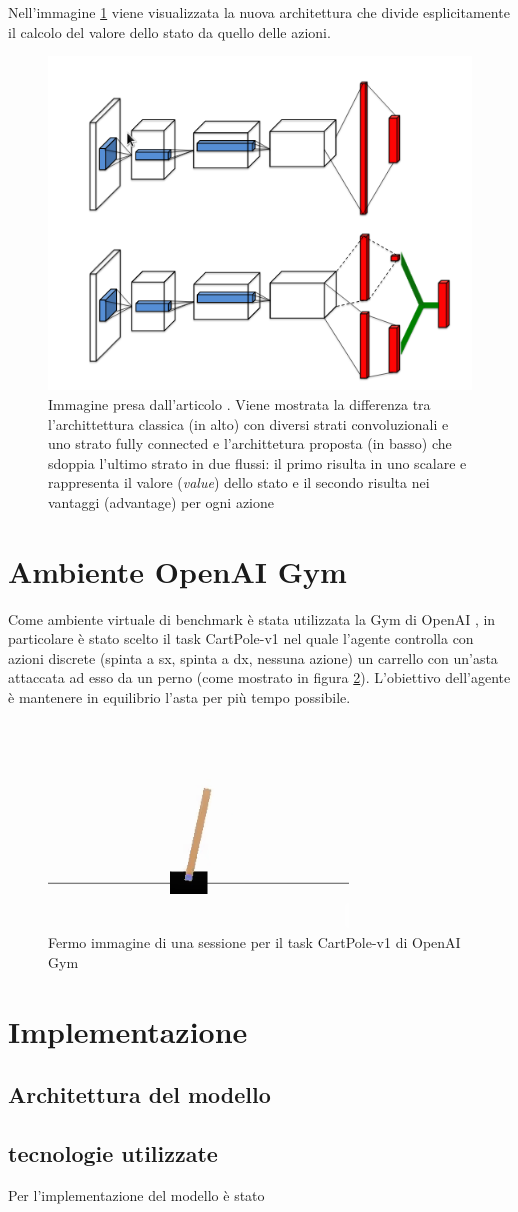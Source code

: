 \documentclass{article}
\begin{document}
		Nell'immagine \ref{fig:dueling_arch} viene visualizzata la nuova architettura che divide esplicitamente il calcolo del valore dello stato da quello delle azioni.

		\begin{figure}[H]
			\centering
			\includegraphics[width=0.5\linewidth]{dueling_arch.png}
			\caption{Immagine presa dall'articolo \cite{1511.06581}. Viene mostrata la differenza tra l'archittettura classica (in alto) con diversi strati convoluzionali e uno strato fully connected e l'archittetura proposta (in basso) che sdoppia l'ultimo strato in due flussi: il primo risulta in uno scalare e rappresenta il valore (\textit{value}) dello stato e il secondo risulta nei vantaggi (advantage) per ogni azione}
			\label{fig:dueling_arch}
		\end{figure}

	\section{Ambiente OpenAI Gym}
		Come ambiente virtuale di benchmark è stata utilizzata la Gym di OpenAI \cite{open.ai}, in particolare è stato scelto il task CartPole-v1 nel quale l'agente controlla con azioni discrete (spinta a sx, spinta a dx, nessuna azione) un carrello con un'asta attaccata ad esso da un perno (come mostrato in figura \ref{fig:cartpole}). L'obiettivo dell'agente è mantenere in equilibrio l'asta per più tempo possibile.

		\begin{figure}[H]
			\centering
			\includegraphics[width=0.3\linewidth]{cartpole.png}
			\caption{Fermo immagine di una sessione per il task CartPole-v1 di OpenAI Gym}
			\label{fig:cartpole}
		\end{figure}

	\section{Implementazione}
	\subsection{Architettura del modello}


	\subsection{tecnologie utilizzate}
		Per l'implementazione del modello è stato 

	\newpage
	{}
	
\end{document}
